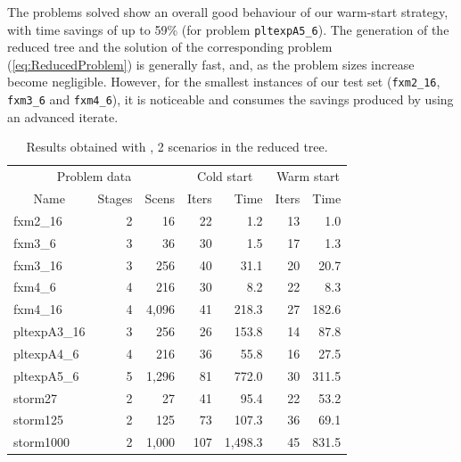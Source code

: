 The problems solved show an overall good behaviour of our warm-start
strategy, with time savings of up to 59\% (for problem {\tt pltexpA5\_6}).
The generation of the reduced tree and the solution of the corresponding
problem (\ref{eq:ReducedProblem}) is generally fast, and, as the problem 
sizes increase become negligible. However, for the smallest instances
of our test set ({\tt fxm2\_16}, {\tt fxm3\_6} and {\tt fxm4\_6}), it
is noticeable and consumes the savings produced by using an advanced
iterate.

\begin{table}[ht]
  \begin{center}
    \begin{tabular}{|l|r|r||r|r||r|r|} \hline
      \multicolumn{3}{|c||}{Problem data}&\multicolumn{2}{c||}{Cold start}&\multicolumn{2}{c|}{Warm start}\\
      \multicolumn{1}{|c|}{Name} & Stages & Scens & Iters & Time & Iters & Time \\ \hline \hline
fxm2\_16     &  2 &   16 &  22 &   1.2 & 13 &   1.0 \\
fxm3\_6      &  3 &   36 &  30 &   1.5 & 17 &   1.3 \\
fxm3\_16     &  3 &  256 &  40 &  31.1 & 20 &  20.7 \\
fxm4\_6      &  4 &  216 &  30 &   8.2 & 22 &   8.3 \\
fxm4\_16     &  4 &4,096 &  41 & 218.3 & 27 & 182.6 \\ \hline
pltexpA3\_16 &  3 &  256 &  26 & 153.8 & 14 &  87.8 \\
pltexpA4\_6  &  4 &  216 &  36 &  55.8 & 16 &  27.5 \\
pltexpA5\_6  &  5 &1,296 &  81 & 772.0 & 30 & 311.5 \\ \hline
storm27      &  2 &   27 &  41 &  95.4 & 22 &  53.2 \\
storm125     &  2 &  125 &  73 & 107.3 & 36 &  69.1 \\
storm1000    &  2 &1,000 & 107 &1,498.3& 45 & 831.5 \\ \hline
    \end{tabular}
    \caption{Results obtained with \HOPDM, 2 scenarios in the reduced tree.}
    \label{table:hopdm}
  \end{center} \vspace{-3ex}
\end{table}

